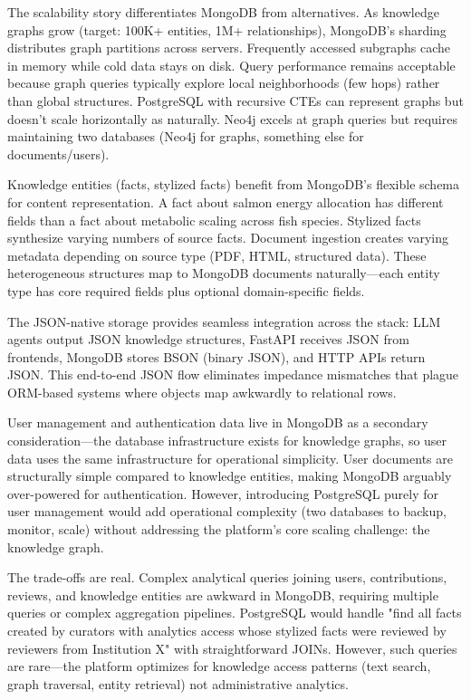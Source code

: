 \documentclass[12pt,a4paper]{article}
\begin{document}
The scalability story differentiates MongoDB from alternatives. As knowledge graphs grow (target: 100K+ entities, 1M+ relationships), MongoDB's sharding distributes graph partitions across servers. Frequently accessed subgraphs cache in memory while cold data stays on disk. Query performance remains acceptable because graph queries typically explore local neighborhoods (few hops) rather than global structures. PostgreSQL with recursive CTEs can represent graphs but doesn't scale horizontally as naturally. Neo4j excels at graph queries but requires maintaining two databases (Neo4j for graphs, something else for documents/users).

Knowledge entities (facts, stylized facts) benefit from MongoDB's flexible schema for content representation. A fact about salmon energy allocation has different fields than a fact about metabolic scaling across fish species. Stylized facts synthesize varying numbers of source facts. Document ingestion creates varying metadata depending on source type (PDF, HTML, structured data). These heterogeneous structures map to MongoDB documents naturally—each entity type has core required fields plus optional domain-specific fields.

The JSON-native storage provides seamless integration across the stack: LLM agents output JSON knowledge structures, FastAPI receives JSON from frontends, MongoDB stores BSON (binary JSON), and HTTP APIs return JSON. This end-to-end JSON flow eliminates impedance mismatches that plague ORM-based systems where objects map awkwardly to relational rows.

User management and authentication data live in MongoDB as a secondary consideration—the database infrastructure exists for knowledge graphs, so user data uses the same infrastructure for operational simplicity. User documents are structurally simple compared to knowledge entities, making MongoDB arguably over-powered for authentication. However, introducing PostgreSQL purely for user management would add operational complexity (two databases to backup, monitor, scale) without addressing the platform's core scaling challenge: the knowledge graph.

The trade-offs are real. Complex analytical queries joining users, contributions, reviews, and knowledge entities are awkward in MongoDB, requiring multiple queries or complex aggregation pipelines. PostgreSQL would handle "find all facts created by curators with analytics access whose stylized facts were reviewed by reviewers from Institution X" with straightforward JOINs. However, such queries are rare—the platform optimizes for knowledge access patterns (text search, graph traversal, entity retrieval) not administrative analytics.
\end{document}
